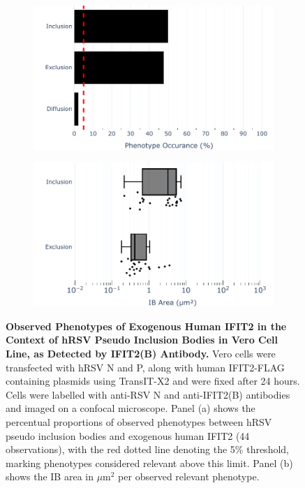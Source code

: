 \begin{figure}
    \begin{subfigure}{0.495\textwidth}
        \caption{}
        \includegraphics[width=1\linewidth]{09. Chapter 4/Figs/01. pIB/03. IFIT2/04. IFIT2-FLAG/02. IFIT2B/01. bar_i2b_hnhp.pdf}
    \end{subfigure}
    \begin{subfigure}{0.495\textwidth}
        \caption{}
        \includegraphics[width=1\linewidth]{09. Chapter 4/Figs/01. pIB/03. IFIT2/04. IFIT2-FLAG/02. IFIT2B/02. box_i2a_hnhp.pdf}
    \end{subfigure}
    \caption[Observed Phenotypes of Exogenous Human IFIT2 in the Context of hRSV Pseudo Inclusion Bodies in Vero Cell Line, as Detected by IFIT2(B) Antibody.]{\textbf{Observed Phenotypes of Exogenous Human IFIT2 in the Context of hRSV Pseudo Inclusion Bodies in Vero Cell Line, as Detected by IFIT2(B) Antibody.} Vero cells were transfected with hRSV N and P, along with human IFIT2-FLAG containing plasmids using TransIT-X2 and were fixed after 24 hours. Cells were labelled with anti-RSV N and anti-IFIT2(B) antibodies and imaged on a confocal microscope. Panel (a) shows the percentual proportions of observed phenotypes between hRSV pseudo inclusion bodies and exogenous human IFIT2 (44 observations), with the red dotted line denoting the 5\% threshold, marking phenotypes considered relevant above this limit. Panel (b) shows the IB area in \(\mu \mbox{m}^2\) per observed relevant phenotype.}
    \label{fig:Observed Phenotypes of Exogenous Human IFIT2 in the Context of hRSV Pseudo Inclusion Bodies in Vero Cell Line, as Detected by IFIT2(B) Antibody}
\end{figure}

